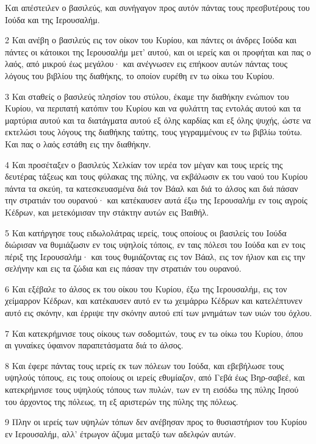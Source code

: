 \par Και απέστειλεν ο βασιλεύς, και συνήγαγον προς αυτόν πάντας τους πρεσβυτέρους του Ιούδα και της Ιερουσαλήμ.
\par 2 Και ανέβη ο βασιλεύς εις τον οίκον του Κυρίου, και πάντες οι άνδρες Ιούδα και πάντες οι κάτοικοι της Ιερουσαλήμ μετ' αυτού, και οι ιερείς και οι προφήται και πας ο λαός, από μικρού έως μεγάλου· και ανέγνωσεν εις επήκοον αυτών πάντας τους λόγους του βιβλίου της διαθήκης, το οποίον ευρέθη εν τω οίκω του Κυρίου.
\par 3 Και σταθείς ο βασιλεύς πλησίον του στύλου, έκαμε την διαθήκην ενώπιον του Κυρίου, να περιπατή κατόπιν του Κυρίου και να φυλάττη τας εντολάς αυτού και τα μαρτύρια αυτού και τα διατάγματα αυτού εξ όλης καρδίας και εξ όλης ψυχής, ώστε να εκτελώσι τους λόγους της διαθήκης ταύτης, τους γεγραμμένους εν τω βιβλίω τούτω. Και πας ο λαός εστάθη εις την διαθήκην.
\par 4 Και προσέταξεν ο βασιλεύς Χελκίαν τον ιερέα τον μέγαν και τους ιερείς της δευτέρας τάξεως και τους φύλακας της πύλης, να εκβάλωσιν εκ του ναού του Κυρίου πάντα τα σκεύη, τα κατεσκευασμένα διά τον Βάαλ και διά το άλσος και διά πάσαν την στρατιάν του ουρανού· και κατέκαυσεν αυτά έξω της Ιερουσαλήμ εν τοις αγροίς Κέδρων, και μετεκόμισαν την στάκτην αυτών εις Βαιθήλ.
\par 5 Και κατήργησε τους ειδωλολάτρας ιερείς, τους οποίους οι βασιλείς του Ιούδα διώρισαν να θυμιάζωσιν εν τοις υψηλοίς τόποις, εν ταις πόλεσι του Ιούδα και εν τοις πέριξ της Ιερουσαλήμ· και τους θυμιάζοντας εις τον Βάαλ, εις τον ήλιον και εις την σελήνην και εις τα ζώδια και εις πάσαν την στρατιάν του ουρανού.
\par 6 Και εξέβαλε το άλσος εκ του οίκου του Κυρίου, έξω της Ιερουσαλήμ, εις τον χείμαρρον Κέδρων, και κατέκαυσεν αυτό εν τω χειμάρρω Κέδρων και κατελέπτυνεν αυτό εις σκόνην, και έρριψε την σκόνην αυτού επί των μνημάτων των υιών του όχλου.
\par 7 Και κατεκρήμνισε τους οίκους των σοδομιτών, τους εν τω οίκω του Κυρίου, όπου αι γυναίκες ύφαινον παραπετάσματα διά το άλσος.
\par 8 Και έφερε πάντας τους ιερείς εκ των πόλεων του Ιούδα, και εβεβήλωσε τους υψηλούς τόπους, εις τους οποίους οι ιερείς εθυμίαζον, από Γεβά έως Βηρ-σαβεέ, και κατεκρήμνισε τους υψηλούς τόπους των πυλών, των εν τη εισόδω της πύλης Ιησού του άρχοντος της πόλεως, τη εξ αριστερών της πύλης της πόλεως.
\par 9 Πλην οι ιερείς των υψηλών τόπων δεν ανέβησαν προς το θυσιαστήριον του Κυρίου εν Ιερουσαλήμ, αλλ' έτρωγον άζυμα μεταξύ των αδελφών αυτών.
